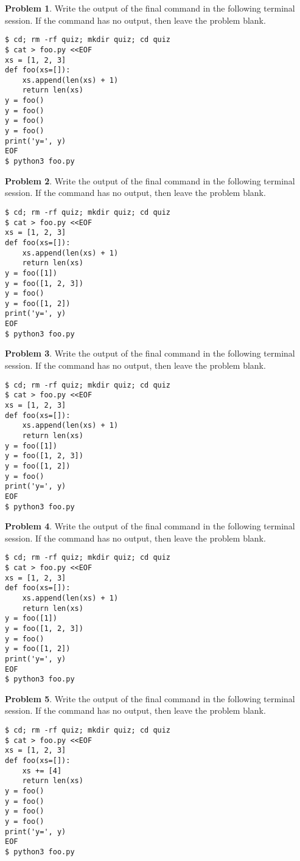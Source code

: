 \documentclass[10pt]{article}
\theoremstyle{definition}
\newtheorem{problem}{Problem}
\begin{document}
\filbreak
\begin{problem}
    Write the output of the final command in the following terminal session.
    If the command has no output, then leave the problem blank.
\end{problem}
\begin{lstlisting}
$ cd; rm -rf quiz; mkdir quiz; cd quiz
$ cat > foo.py <<EOF
xs = [1, 2, 3]
def foo(xs=[]):
    xs.append(len(xs) + 1)
    return len(xs)
y = foo()
y = foo()
y = foo()
y = foo()
print('y=', y)
EOF
$ python3 foo.py
\end{lstlisting}


\filbreak
\begin{problem}
    Write the output of the final command in the following terminal session.
    If the command has no output, then leave the problem blank.
\end{problem}
\begin{lstlisting}
$ cd; rm -rf quiz; mkdir quiz; cd quiz
$ cat > foo.py <<EOF
xs = [1, 2, 3]
def foo(xs=[]):
    xs.append(len(xs) + 1)
    return len(xs)
y = foo([1])
y = foo([1, 2, 3])
y = foo()
y = foo([1, 2])
print('y=', y)
EOF
$ python3 foo.py
\end{lstlisting}


\filbreak
\begin{problem}
    Write the output of the final command in the following terminal session.
    If the command has no output, then leave the problem blank.
\end{problem}
\begin{lstlisting}
$ cd; rm -rf quiz; mkdir quiz; cd quiz
$ cat > foo.py <<EOF
xs = [1, 2, 3]
def foo(xs=[]):
    xs.append(len(xs) + 1)
    return len(xs)
y = foo([1])
y = foo([1, 2, 3])
y = foo([1, 2])
y = foo()
print('y=', y)
EOF
$ python3 foo.py
\end{lstlisting}

\filbreak
\begin{problem}
    Write the output of the final command in the following terminal session.
    If the command has no output, then leave the problem blank.
\end{problem}
\begin{lstlisting}
$ cd; rm -rf quiz; mkdir quiz; cd quiz
$ cat > foo.py <<EOF
xs = [1, 2, 3]
def foo(xs=[]):
    xs.append(len(xs) + 1)
    return len(xs)
y = foo([1])
y = foo([1, 2, 3])
y = foo()
y = foo([1, 2])
print('y=', y)
EOF
$ python3 foo.py
\end{lstlisting}

\filbreak
\begin{problem}
    Write the output of the final command in the following terminal session.
    If the command has no output, then leave the problem blank.
\end{problem}
\begin{lstlisting}
$ cd; rm -rf quiz; mkdir quiz; cd quiz
$ cat > foo.py <<EOF
xs = [1, 2, 3]
def foo(xs=[]):
    xs += [4]
    return len(xs)
y = foo()
y = foo()
y = foo()
y = foo()
print('y=', y)
EOF
$ python3 foo.py
\end{lstlisting}
\end{document}
